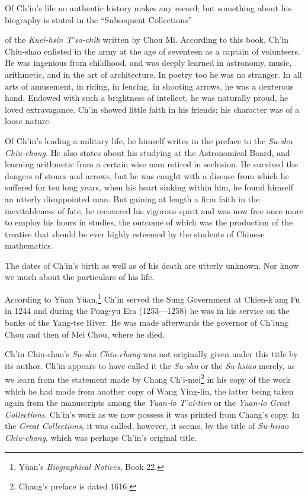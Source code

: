 \documentclass[11pt]{article}
\newcommand{\scanpage}[2]{\clearpage\setcounter{footnote}{0}\noindent{\footnotesize\color{gray}PDF page #1 · #2}\par\medskip}
\newcommand{\scanfooter}{}
\begin{document}
Of Ch'in's life no authentic history makes any record; but something about his biography is stated in the ``Subsequent Collections''
\scanfooter

\scanpage{0078}{Chapter 11, printed page 64}
\setcounter{footnote}{0}
of the \emph{Kuei-hsin T'sa-chih} written by Chou Mi. According to this book, Ch'in Chiu-shao enlisted in the army at the age of seventeen as a captain of volunteers. He was ingenious from childhood, and was deeply learned in astronomy, music, arithmetic, and in the art of architecture. In poetry too he was no stranger. In all arts of amusement, in riding, in fencing, in shooting arrows, he was a dexterous hand. Endowed with such a brightness of intellect, he was naturally proud, he loved extravagance. Ch'in showed little faith in his friends; his character was of a loose nature.

Of Ch'in's leading a military life, he himself writes in the preface to the \emph{Su-shu Chiu-chang}. He also states about his studying at the Astronomical Board, and learning arithmetic from a certain wise man retired in seclusion. He survived the dangers of stones and arrows, but he was caught with a disease from which he suffered for ten long years, when his heart sinking within him, he found himself an utterly disappointed man. But gaining at length a firm faith in the inevitableness of fate, he recovered his vigorous spirit and was now free once more to employ his hours in studies, the outcome of which was the production of the treatise that should be ever highly esteemed by the students of Chinese mathematics.

The dates of Ch'in's birth as well as of his death are utterly unknown. Nor know we much about the particulars of his life.

According to Yüan Yüan,\footnote{Yüan's \emph{Biographical Notices}, Book 22.} Ch'in served the Sung Government at Chien-k'ang Fu in 1244 and during the Pong-yu Era (1253---1258) he was in his service on the banks of the Yang-tse River. He was made afterwards the governor of Ch'iung Chou and then of Mei Chou, where he died.

Ch'in Chiu-shao's \emph{Su-shu Chiu-chang} was not originally given under this title by its author. Ch'in appears to have called it the \emph{Su-shu} or the \emph{Su-hsiao} merely, as we learn from the statement made by Chang Ch'i-mei\footnote{Chang's preface is dated 1616.} in his copy of the work which he had made from another copy of Wang Ying-lin, the latter being taken again from the manuscripts among the \emph{Yuan-lo T'ai-tien} or the \emph{Yuan-lo Great Collections}. Ch'in's work as we now possess it was printed from Chang's copy. In the \emph{Great Collections}, it was called, however, it seems, by the title of \emph{Su-hsiao Chiu-chang}, which was perhaps Ch'in's original title.
\scanfooter
\end{document}
